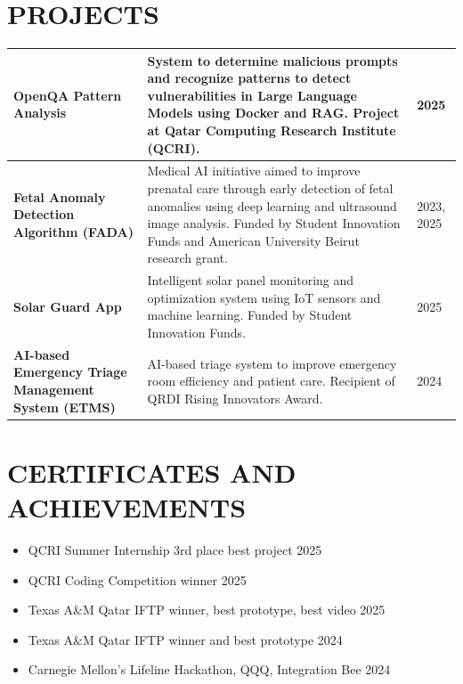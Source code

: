 \documentclass[11pt,a4paper]{article}
\begin{document}
\section*{PROJECTS}
\noindent\begin{tabular}{|p{}|p{}|p{}|}
\hline
\textbf{OpenQA Pattern Analysis} & System to determine malicious prompts and recognize patterns to detect vulnerabilities in Large Language Models using Docker and RAG. Project at Qatar Computing Research Institute (QCRI). & 2025 \\[8pt]
\hline

\textbf{Fetal Anomaly Detection Algorithm (FADA)} & Medical AI initiative aimed to improve prenatal care through early detection of fetal anomalies using deep learning and ultrasound image analysis. Funded by Student Innovation Funds and American University Beirut research grant. & 2023, 2025 \\[8pt]
\hline

\textbf{Solar Guard App} & Intelligent solar panel monitoring and optimization system using IoT sensors and machine learning. Funded by Student Innovation Funds. & 2025 \\[8pt]
\hline

\textbf{AI-based Emergency Triage Management System (ETMS)} & AI-based triage system to improve emergency room efficiency and patient care. Recipient of QRDI Rising Innovators Award. & 2024 \\
\hline
\end{tabular}

\section*{CERTIFICATES AND ACHIEVEMENTS}
\begin{itemize}[leftmargin=0em, nosep, label={}]
    \item QCRI Summer Internship 3rd place best project \hfill 2025
    \item QCRI Coding Competition winner \hfill 2025
    \item Texas A\&M Qatar IFTP winner, best prototype, best video \hfill 2025
    \item Texas A\&M Qatar IFTP winner and best prototype \hfill 2024
    \item Carnegie Mellon's Lifeline Hackathon, QQQ, Integration Bee \hfill 2024
\end{itemize}
\end{document}
